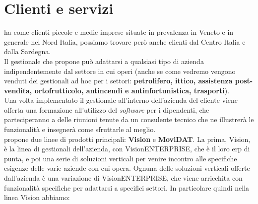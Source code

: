 \section{Clienti e servizi}
{\company} ha come clienti piccole e medie imprese situate in prevalenza in Veneto e in generale nel Nord Italia, possiamo trovare però 
anche clienti dal Centro Italia e dalla Sardegna. \\
Il gestionale che propone può adattarsi a qualsiasi tipo di azienda indipendentemente dal settore in cui 
operi (anche se come vedremo vengono venduti dei gestionali ad hoc per i settori: \textbf{petrolifero, ittico, assistenza post-vendita, ortofrutticolo, antincendi 
e antinfortunistica, trasporti}).\\ Una volta implementato il gestionale all'interno dell'azienda del cliente viene offerta una formazione all'utilizzo del 
\textit{software} per i dipendenti, che parteciperanno a delle riunioni tenute da un consulente tecnico che ne illustrerà le funzionalità e insegnerà come sfruttarle 
al meglio.\\
{\company} propone due linee di prodotti principali: \textbf{Vision} e \textbf{MoviDAT}.
La prima, Vision, è la linea di gestionali dell'azienda, con VisionENTERPRISE, che è il loro \gls{erp} di punta, 
e poi una serie di soluzioni verticali per venire incontro alle specifiche esigenze delle varie aziende con cui {\company} opera.
Ognuna delle soluzioni verticali offerte dall'azienda è una variazione di VisionENTERPRISE, che viene arricchita con 
funzionalità specifiche per adattarsi a specifici settori. In particolare quindi nella linea Vision abbiamo:
